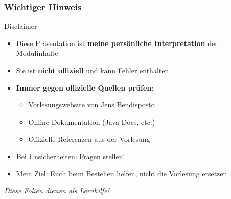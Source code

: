 \begin{frame}
  \thispagestyle{empty}
  \frametitle{Wichtiger Hinweis}
  \begin{alertblock}{Disclaimer}
    \begin{itemize}
      \item Diese Präsentation ist \textbf{meine persönliche Interpretation} der Modulinhalte
      \item Sie ist \textbf{nicht offiziell} und kann Fehler enthalten
      \item \textbf{Immer gegen offizielle Quellen prüfen}:
      \begin{itemize}
        \item Vorlesungswebsite von Jens Bendisposto
        \item Online-Dokumentation (Java Docs, etc.)
        \item Offizielle Referenzen aus der Vorlesung
      \end{itemize}
      \item Bei Unsicherheiten: Fragen stellen!
      \item Mein Ziel: Euch beim Bestehen helfen, nicht die Vorlesung ersetzen
    \end{itemize}
  \end{alertblock}

  \begin{center}
    {\small \textit{Diese Folien dienen als Lernhilfe!}}
  \end{center}
\end{frame}
